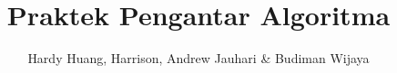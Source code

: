 \documentclass[a4paper,11pt]{report}
\author{Hardy Huang, Harrison, Andrew Jauhari \& Budiman Wijaya}
\title{Praktek Pengantar Algoritma}
\begin{document}
\maketitle

\renewcommand{\chaptername}{Modul}
\renewcommand{\figurename}{Gambar}
\renewcommand{\appendixname}{Lampiran}
%
%

%
%
%
%
%
%
%
%
%
\end{document}
